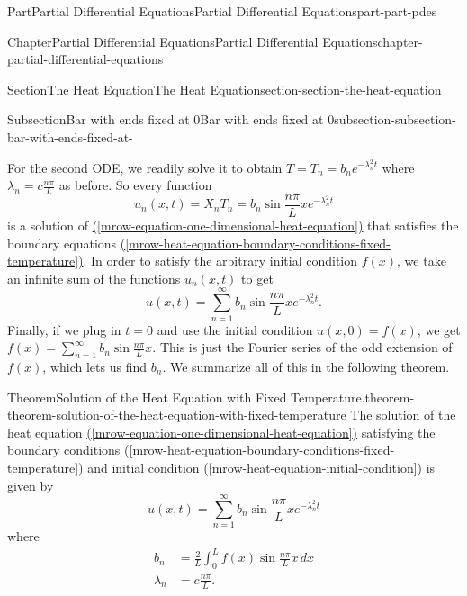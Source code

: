 \documentclass[twoside,10pt,]{book}
\newcommand{\xreffont}{\relax}
\numberwithin{equation}{part}
\newcommand{\amp}{&}
\begin{document}
\begin{partptx}{Part}{Partial Differential Equations}{}{Partial Differential Equations}{}{}{part-part-pdes}
\begin{chapterptx}{Chapter}{Partial Differential Equations}{}{Partial Differential Equations}{}{}{chapter-partial-differential-equations}
\begin{sectionptx}{Section}{The Heat Equation}{}{The Heat Equation}{}{}{section-section-the-heat-equation}
\begin{subsectionptx}{Subsection}{Bar with ends fixed at \(0\)}{}{Bar with ends fixed at \(0\)}{}{}{subsection-subsection-bar-with-ends-fixed-at-}
\par
For the second ODE, we readily solve it to obtain \(T = T_{n} = b_{n}e^{-\lambda_{n}^{2}t}\) where \(\lambda_{n} = c\frac{n\pi}{L}\) as before. So every function%
\begin{equation*}
u_{n}(x,t) = X_{n}T_{n} = b_{n}\sin\frac{n\pi}{L}xe^{-\lambda_{n}^{2}t}
\end{equation*}
is a solution of \hyperref[mrow-equation-one-dimensional-heat-equation]{({\xreffont\ref{mrow-equation-one-dimensional-heat-equation}})} that satisfies the boundary equations \hyperref[mrow-heat-equation-boundary-conditions-fixed-temperature]{({\xreffont\ref{mrow-heat-equation-boundary-conditions-fixed-temperature}})}. In order to satisfy the arbitrary initial condition \(f(x)\), we take an infinite sum of the functions \(u_{n}(x,t)\) to get%
%
\begin{equation*}
u(x,t) = \sum_{n=1}^{\infty}b_{n}\sin\frac{n\pi}{L}x e^{-\lambda^{2}_{n}t}.
\end{equation*}
Finally, if we plug in \(t=0\) and use the initial condition \(u(x,0) = f(x)\), we get \(f(x) = \sum_{n=1}^{\infty}b_{n}\sin\frac{n\pi}{L}x\). This is just the Fourier series of the odd extension of \(f(x)\), which lets us find \(b_{n}\). We summarize all of this in the following theorem.%
\begin{theorem}{Theorem}{Solution of the Heat Equation with Fixed Temperature.}{}{theorem-theorem-solution-of-the-heat-equation-with-fixed-temperature}%
%
The solution of the heat equation \hyperref[mrow-equation-one-dimensional-heat-equation]{({\xreffont\ref{mrow-equation-one-dimensional-heat-equation}})} satisfying the boundary conditions \hyperref[mrow-heat-equation-boundary-conditions-fixed-temperature]{({\xreffont\ref{mrow-heat-equation-boundary-conditions-fixed-temperature}})} and initial condition \hyperref[mrow-heat-equation-initial-condition]{({\xreffont\ref{mrow-heat-equation-initial-condition}})} is given by%
\begin{equation}
u(x,t) = \sum_{n=1}^{\infty}b_{n}\sin\frac{n\pi}{L}x e^{-\lambda^{2}_{n}t}\label{men-heat-equation-fixed-ends-solution}
\end{equation}
where%
\begin{align}
b_{n} \amp = \frac{2}{L}\int_{0}^{L}f(x)\sin\frac{n\pi}{L}x\,dx \label{mrow-heat-equation-fixed-ends-solution-coeff}\\
\lambda_{n} \amp = c\frac{n\pi}{L}. \label{mrow-heat-equation-fixed-ends-solution-exponent}
\end{align}

\end{theorem}
\end{subsectionptx}
\end{sectionptx}
\end{chapterptx}
\end{partptx}
\end{document}
